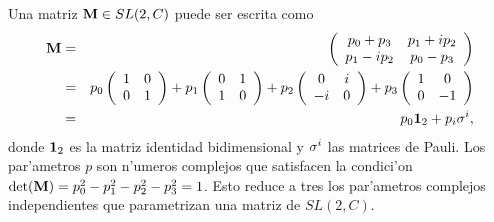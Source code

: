 Una matriz ${\bf M}\in SL(2,C)$ puede ser escrita como 
\begin{eqnarray*}
{\bf M} &=&\left( 
\begin{array}{cc}
p_{0}+p_{3} & p_{1}+ip_{2} \\ 
p_{1}-ip_{2} & p_{0}-p_{3}
\end{array}
\right) \\
&=&p_{0}\left( 
\begin{array}{cc}
1 & 0 \\ 
0 & 1
\end{array}
\right) +p_{1}\left( 
\begin{array}{cc}
0 & 1 \\ 
1 & 0
\end{array}
\right) +p_{2}\left( 
\begin{array}{cc}
0 & i \\ 
-i & 0
\end{array}
\right) +p_{3}\left( 
\begin{array}{cc}
1 & 0 \\ 
0 & -1
\end{array}
\right) \\
&=&p_{0}{\bf 1}_{2}+p_{i}{\bf \sigma }^{i},
\end{eqnarray*}
donde ${\bf 1}_{2}$ es la matriz identidad bidimensional y ${\bf \sigma }^{i}
$ las matrices de Pauli. Los par'ametros $p$ son n'umeros complejos
que satisfacen la condici'on $\det ({\bf M}%
)=p_{0}^2-p_{1}^2-p_{2}^2-p_{3}^2=1$. Esto reduce a tres los
par'ametros complejos independientes que parametrizan una matriz de $%
SL(2,C)$.

